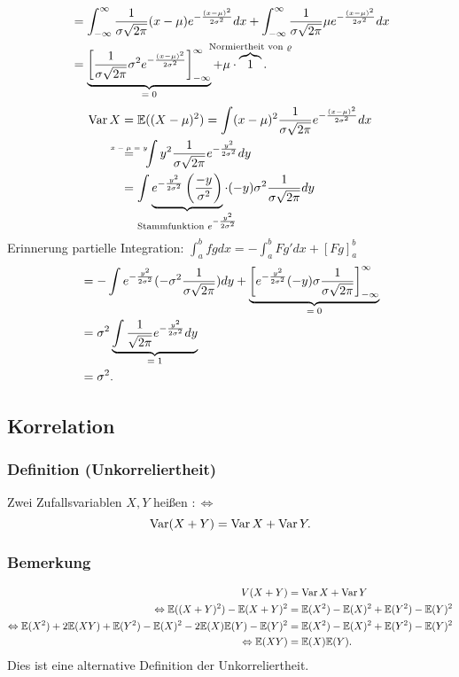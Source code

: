 {\begin{align*}
&=\int_{-\infty}^{\infty}\frac{1}{\sigma\sqrt{2\pi}}(x-\mu)e^{-\frac{(x-\mu)^2}{2\sigma^2}}dx
+\int_{-\infty}^{\infty}\frac{1}{\sigma\sqrt{2\pi}}\mu e^{-\frac{(x-\mu)^2}{2\sigma^2}}dx\\
&=\ubr{\left[\frac{1}{\sigma\sqrt{2\pi}}\sigma^2e^{-\frac{(x-\mu)^2}{2\sigma^2}}\right]_{-\infty}^\infty}{$=0$}
+\mu\cdot\obr{1}{Normiertheit von $\varrho$}.
\end{align*}
\begin{align*}
\Var X&=\mathbb{E}((X-\mu)^2)=\int(x-\mu)^2\frac{1}{\sigma\sqrt{2\pi}}e^{-\frac{(x-\mu)^2}{2\sigma^2}}dx\\
&\textabove{$x-\mu=y$}{=}\ \ \int y^2\frac{1}{\sigma\sqrt{2\pi}}e^{-\frac{y^2}{2\sigma^2}}dy\\
&=\int \ubr{e^{-\frac{y^2}{2\sigma^2}}\left(\frac{-y}{\sigma^2}\right)}{Stammfunktion $e^{-\frac{y^2}{2\sigma^2}}$}\cdot(-y)\sigma^2\frac{1}{\sigma\sqrt{2\pi}}dy\\
\end{align*}
Erinnerung partielle Integration: $\int_a^bfgdx=-\int_a^bFg'dx+[Fg]_a^b$
\begin{align*}
&=-\int e^{-\frac{y^2}{2\sigma^2}}(-\sigma^2\frac{1}{\sigma\sqrt{2\pi}})dy
+\ubr{\left[e^{-\frac{y^2}{2\sigma^2}}(-y)\sigma\frac{1}{\sigma\sqrt{2\pi}}\right]_{-\infty}^\infty}{$=0$}\\
&=\sigma^2\ubr{\int\frac{1}{\sqrt{2\pi}}e^{-\frac{y^2}{2\sigma^2}}dy}{$=1$}\\
&=\sigma^2.
\end{align*}
}
\subsection{Korrelation}
\subsubsection{Definition (Unkorreliertheit)}
Zwei Zufallsvariablen $X,Y$ hei\ss{}en  $:\Leftrightarrow$
\[
\operatorname{Var}(X+Y)=\operatorname{Var} X+\operatorname{Var} Y.
\]
\subsubsection{Bemerkung}
\begin{align*}
V(X+Y)&=\operatorname{Var} X+\operatorname{Var} Y\\
\Leftrightarrow\mathbb{E}((X+Y)^2)-\mathbb{E}(X+Y)^2&=\mathbb{E}(X^2)-\mathbb{E}(X)^2+\mathbb{E}(Y^2)-\mathbb{E}(Y)^2\\
\Leftrightarrow\mathbb{E}(X^2)+2\mathbb{E}(XY)+\mathbb{E}(Y^2)-\mathbb{E}(X)^2-2\mathbb{E}(X)\mathbb{E}(Y)-\mathbb{E}(Y)^2&=\mathbb{E}(X^2)-\mathbb{E}(X)^2+\mathbb{E}(Y^2)-\mathbb{E}(Y)^2\\
\Leftrightarrow\mathbb{E}(XY)&=\mathbb{E}(X)\mathbb{E}(Y).
\end{align*}
Dies ist eine alternative Definition der Unkorreliertheit.
